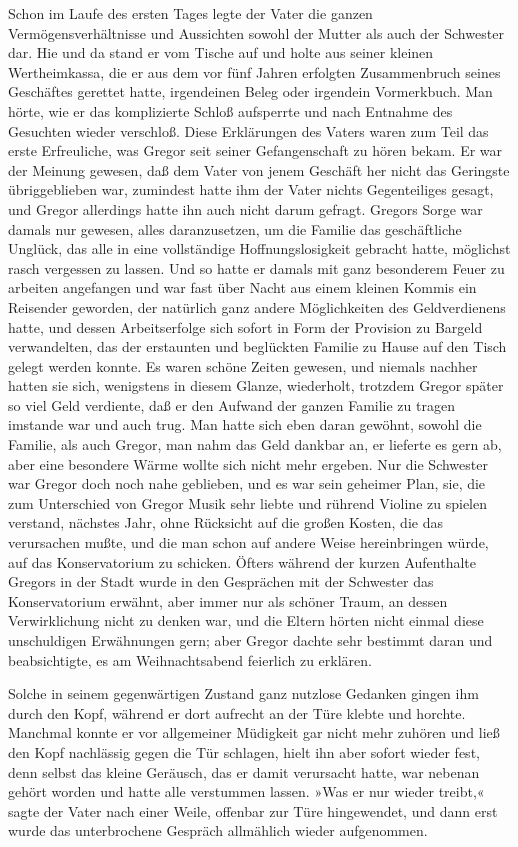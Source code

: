 Schon im Laufe des ersten Tages legte der Vater die ganzen
Vermögensverhältnisse und Aussichten sowohl der Mutter als auch der
Schwester dar. Hie und da stand er vom Tische auf und holte aus seiner
kleinen Wertheimkassa, die er aus dem vor fünf Jahren erfolgten
Zusammenbruch seines Geschäftes gerettet hatte, irgendeinen Beleg oder
irgendein Vormerkbuch. Man hörte, wie er das komplizierte Schloß
aufsperrte und nach Entnahme des Gesuchten wieder verschloß. Diese
Erklärungen des Vaters waren zum Teil das erste Erfreuliche, was Gregor
seit seiner Gefangenschaft zu hören bekam. Er war der Meinung gewesen,
daß dem Vater von jenem Geschäft her nicht das Geringste übriggeblieben
war, zumindest hatte ihm der Vater nichts Gegenteiliges gesagt, und
Gregor allerdings hatte ihn auch nicht darum gefragt. Gregors Sorge war
damals nur gewesen, alles daranzusetzen, um die Familie das
geschäftliche Unglück, das alle in eine vollständige Hoffnungslosigkeit
gebracht hatte, möglichst rasch vergessen zu lassen. Und so hatte er
damals mit ganz besonderem Feuer zu arbeiten angefangen und war fast
über Nacht aus einem kleinen Kommis ein Reisender geworden, der
natürlich ganz andere Möglichkeiten des Geldverdienens hatte, und dessen
Arbeitserfolge sich sofort in Form der Provision zu Bargeld
verwandelten, das der erstaunten und beglückten Familie zu Hause auf den
Tisch gelegt werden konnte. Es waren schöne Zeiten gewesen, und niemals
nachher hatten sie sich, wenigstens in diesem Glanze, wiederholt,
trotzdem Gregor später so viel Geld verdiente, daß er den Aufwand der
ganzen Familie zu tragen imstande war und auch trug. Man hatte sich eben
daran gewöhnt, sowohl die Familie, als auch Gregor, man nahm das Geld
dankbar an, er lieferte es gern ab, aber eine besondere Wärme wollte
sich nicht mehr ergeben. Nur die Schwester war Gregor doch noch nahe
geblieben, und es war sein geheimer Plan, sie, die zum Unterschied von
Gregor Musik sehr liebte und rührend Violine zu spielen verstand,
nächstes Jahr, ohne Rücksicht auf die großen Kosten, die das verursachen
mußte, und die man schon auf andere Weise hereinbringen würde, auf das
Konservatorium zu schicken. Öfters während der kurzen Aufenthalte
Gregors in der Stadt wurde in den Gesprächen mit der Schwester das
Konservatorium erwähnt, aber immer nur als schöner Traum, an dessen
Verwirklichung nicht zu denken war, und die Eltern hörten nicht einmal
diese unschuldigen Erwähnungen gern; aber Gregor dachte sehr bestimmt
daran und beabsichtigte, es am Weihnachtsabend feierlich zu erklären.

Solche in seinem gegenwärtigen Zustand ganz nutzlose Gedanken gingen ihm
durch den Kopf, während er dort aufrecht an der Türe klebte und horchte.
Manchmal konnte er vor allgemeiner Müdigkeit gar nicht mehr zuhören und
ließ den Kopf nachlässig gegen die Tür schlagen, hielt ihn aber sofort
wieder fest, denn selbst das kleine Geräusch, das er damit verursacht
hatte, war nebenan gehört worden und hatte alle verstummen lassen. »Was
er nur wieder treibt,« sagte der Vater nach einer Weile, offenbar zur
Türe hingewendet, und dann erst wurde das unterbrochene Gespräch
allmählich wieder aufgenommen.


